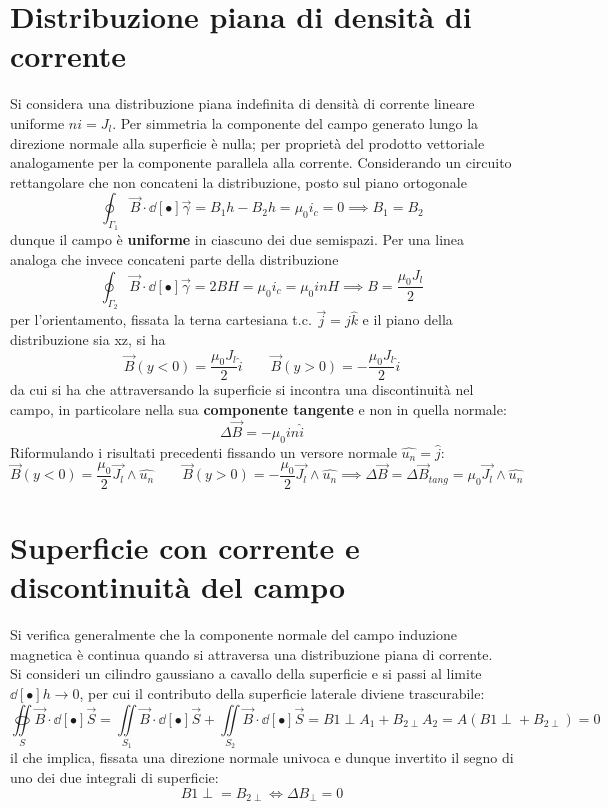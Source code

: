 \section{Distribuzione piana di densità di corrente}
Si considera una distribuzione piana indefinita di densità di corrente lineare uniforme $n i = J_l$. Per simmetria la componente del campo generato lungo la direzione normale alla superficie è nulla; per proprietà del prodotto vettoriale analogamente per la componente parallela alla corrente. Considerando un circuito rettangolare che non concateni la distribuzione, posto sul piano ortogonale
\[\oint_{\Gamma_1} \vec{B} \cdot \dd[•]{\vec{\gamma}} = B_1 h - B_2 h = \mu_0 i_c = 0 \implies B_1 = B_2\]
dunque il campo è \textbf{uniforme} in ciascuno dei due semispazi. Per una linea analoga che invece concateni parte della distribuzione
\[\oint_{\Gamma_2} \vec{B} \cdot \dd[•]{\vec{\gamma}} = 2 B H = \mu_0 i_c = \mu_0 i n H \implies B = \frac{\mu_0 J_l}{2}\]
per l'orientamento, fissata la terna cartesiana t.c. $\vec{j} = j \hat{k}$ e il piano della distribuzione sia xz, si ha
\[\vec{B}(y < 0) = \frac{\mu_0 J_l}{2} \hat{i} \qquad \vec{B}(y > 0) = - \frac{\mu_0 J_l}{2} \hat{i}\]
da cui si ha che attraversando la superficie si incontra una discontinuità nel campo, in particolare nella sua \textbf{componente tangente} e non in quella normale:
\[\Delta \vec{B} = - \mu_0 i n \hat{i}\]
Riformulando i risultati precedenti fissando un versore normale $\hat{u_n} = \hat{j}$:
\[\vec{B}(y < 0) = \frac{\mu_0}{2} \vec{J_l} \wedge \hat{u_n} \qquad \vec{B}(y > 0) = - \frac{\mu_0}{2} \vec{J_l} \wedge \hat{u_n} \implies \Delta \vec{B} = \Delta \vec{B}_{tang} = \mu_0 \vec{J_l} \wedge \hat{u_n}\]

\section{Superficie con corrente e discontinuità del campo}
Si verifica generalmente che la componente normale del campo induzione magnetica è continua quando si attraversa una distribuzione piana di corrente.
\\Si consideri un cilindro gaussiano a cavallo della superficie e si passi al limite $\dd[•]{h} \rightarrow 0$, per cui il contributo della superficie laterale diviene trascurabile:
\[\oiint\limits_S \vec{B} \cdot \dd[•]{\vec{S}} = \iint\limits_{S_1} \vec{B} \cdot \dd[•]{\vec{S}} + \iint\limits_{S_2} \vec{B} \cdot \dd[•]{\vec{S}} = B{1 \perp} A_1 + B_{2 \perp} A_2 = A (B{1 \perp} + B_{2 \perp}) = 0\]
il che implica, fissata una direzione normale univoca e dunque invertito il segno di uno dei due integrali di superficie:
\[B{1 \perp} = B_{2 \perp} \Longleftrightarrow \Delta B_{\perp} = 0\]











